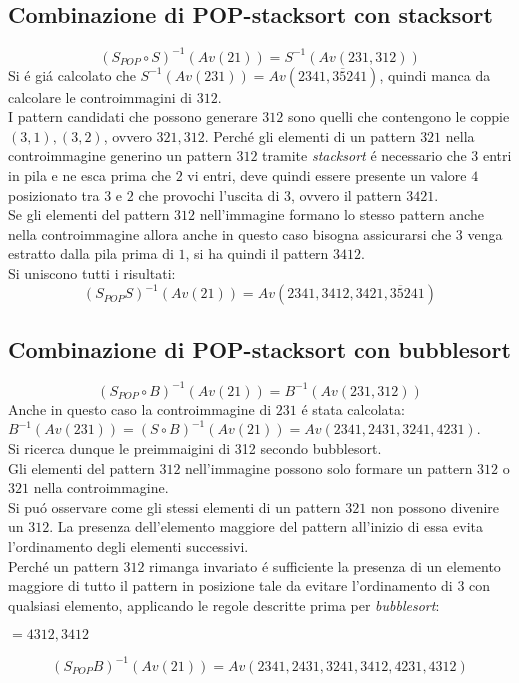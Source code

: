 \subsection*{Combinazione di {POP-stacksort} con {stacksort}}
$$(S_{POP}\circ{S})^{-1}(Av(21))=S^{-1}(Av(231,312))$$
Si \'e gi\'a calcolato che $S^{-1}(Av(231))=Av(2341, 3\overline{5}241)$, quindi manca da calcolare le controimmagini di $312$.\\
I pattern candidati che possono generare $312$ sono quelli che contengono le coppie $(3,1),(3,2)$, ovvero $321, 312$.
Perch\'e gli elementi di un pattern $321$ nella controimmagine generino un pattern $312$ tramite \textit{stacksort} \'e necessario che $3$ entri in pila e ne esca prima che $2$ vi entri, deve quindi essere presente un valore $4$ posizionato tra $3$ e $2$ che provochi l'uscita di $3$, ovvero il pattern $3421$.\\
Se gli elementi del pattern $312$ nell'immagine formano lo stesso pattern anche nella controimmagine allora anche in questo caso bisogna assicurarsi che $3$ venga estratto dalla pila prima di $1$, si ha quindi il pattern $3412$.\\Si uniscono tutti i risultati:
$$(S_{POP}S)^{-1}(Av(21))=Av(2341, 3412, 3421, 3\overline{5}241)$$
\subsection*{Combinazione di {POP-stacksort} con {bubblesort}}
$$(S_{POP}\circ{B})^{-1}(Av(21))=B^{-1}(Av(231,312))$$
Anche in questo caso la controimmagine di $231$ \'e stata calcolata: $B^{-1}(Av(231)) = (S\circ{B})^{-1}(Av(21)) = Av(2341, 2431, 3241, 4231)$.\\
Si ricerca dunque le preimmaigini di 312 secondo bubblesort. \\
Gli elementi del pattern $312$ nell'immagine possono solo formare un pattern $312$ o $321$ nella controimmagine.\\
Si pu\'o osservare come gli stessi elementi di un pattern $321$ non possono divenire un $312$. La presenza dell'elemento maggiore del pattern all'inizio di essa evita l'ordinamento degli elementi successivi.\\
Perch\'e un pattern $312$ rimanga invariato \'e sufficiente la presenza di un elemento maggiore di tutto il pattern in posizione tale da evitare l'ordinamento di $3$ con qualsiasi elemento, applicando le regole descritte prima per \textit{bubblesort}: 
\begin{center}
$=4312,3412$
\end{center}
$$(S_{POP}{B})^{-1}(Av(21))=Av(2341, 2431, 3241, 3412, 4231, 4312)$$

